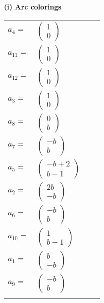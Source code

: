 \documentclass[1p]{elsarticle_modified}
\theoremstyle{definition}
\begin{document}
\flushleft \textbf{(i) Arc colorings}\\
\begin{tabular}{m{7pt} m{180pt} m{7pt} m{180pt} }
\flushright $a_{4}=$&$\begin{pmatrix}1\\0\end{pmatrix}$ \\
\flushright $a_{11}=$&$\begin{pmatrix}1\\0\end{pmatrix}$ \\
\flushright $a_{12}=$&$\begin{pmatrix}1\\0\end{pmatrix}$ \\
\flushright $a_{3}=$&$\begin{pmatrix}1\\0\end{pmatrix}$ \\
\flushright $a_{8}=$&$\begin{pmatrix}0\\b\end{pmatrix}$ \\
\flushright $a_{7}=$&$\begin{pmatrix}- b\\b\end{pmatrix}$ \\
\flushright $a_{5}=$&$\begin{pmatrix}- b+2\\b-1\end{pmatrix}$ \\
\flushright $a_{2}=$&$\begin{pmatrix}2 b\\- b\end{pmatrix}$ \\
\flushright $a_{6}=$&$\begin{pmatrix}- b\\b\end{pmatrix}$ \\
\flushright $a_{10}=$&$\begin{pmatrix}1\\b-1\end{pmatrix}$ \\
\flushright $a_{1}=$&$\begin{pmatrix}b\\- b\end{pmatrix}$ \\
\flushright $a_{9}=$&$\begin{pmatrix}- b\\b\end{pmatrix}$\\&\end{tabular}
\end{document}
